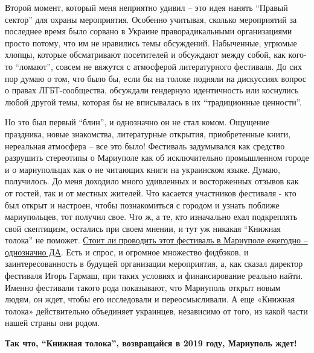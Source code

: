 
Второй момент, который меня неприятно удивил – это идея нанять \enquote{Правый сектор}
для охраны мероприятия. Особенно учитывая, сколько мероприятий за последнее
время было сорвано в Украине праворадикальными организациями просто потому, что
им не нравились темы обсуждений. Набыченные, угрюмые хлопцы, которые
обсматривают посетителей и обсуждают между собой, как кого-то \enquote{ломают}, совсем
не вяжутся с атмосферой литературного фестиваля. До сих пор думаю о том, что
было бы, если бы на толоке подняли на дискуссиях вопрос о правах
ЛГБТ-сообщества, обсуждали гендерную идентичность или коснулись любой другой
темы, которая бы не вписывалась в их \enquote{традиционные ценности}.


Но это был первый \enquote{блин}, и однозначно он не стал комом. Ощущение праздника,
новые знакомства, литературные открытия, приобретенные книги, нереальная
атмосфера – все это было! Фестиваль задумывался как средство разрушить
стереотипы о Мариуполе как об исключительно промышленном городе и о
мариупольцах как о не читающих книги на украинском языке. Думаю, получилось. До
меня доходило много удивленных и восторженных отзывов как от гостей, так и от
местных жителей. Что касается участников фестиваля - кто был открыт и настроен,
чтобы познакомиться с городом и узнать поближе мариупольцев, тот получил свое.
Что ж, а те, кто изначально ехал подкреплять свой скептицизм, остались при
своем мнении, и тут уж никакая \enquote{Книжная толока} не поможет. \href{https://mrpl.city/news/view/vernetsya-li-knizhnaya-toloka-v-mariupol-ob-uspehah-i-perspektivah-foto}{Стоит ли проводить
этот фестиваль в Мариуполе ежегодно – однозначно ДА}. Есть и спрос, и огромное
множество фидбэков, и заинтересованность в будущей организации мероприятия, а,
как сказал директор фестиваля Игорь Гармаш, при таких условиях и финансирование
реально найти. Именно фестивали такого рода показывают, что Мариуполь открыт
новым людям, он ждет, чтобы его исследовали и переосмысливали. А еще «Книжная
толока» действительно объединяет украинцев, независимо от того, из какой части
нашей страны они родом.

\textbf{Так что, \enquote{Книжная толока}, возвращайся в 2019 году, Мариуполь ждет!}
